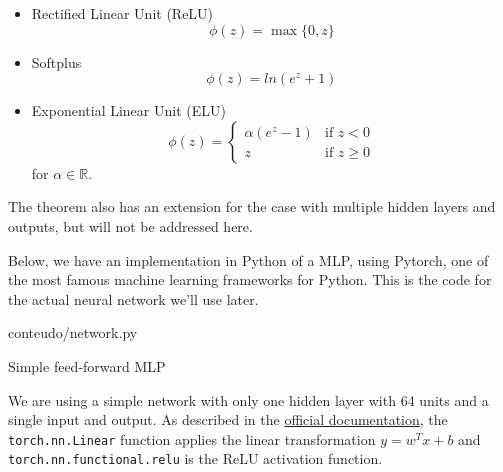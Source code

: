 \begin{itemize}
    \item Rectified Linear Unit (ReLU)
    \[
        \phi(z) = \max\{0, z\}    
    \]
    \item Softplus
    \[
        \phi(z) = ln(e^z+1)
    \]
    \item Exponential Linear Unit (ELU)
    \begin{equation*}
        \phi(z)=
            \begin{cases}
                \alpha(e^z-1) & \text{if } z < 0 \\
                z & \text{if } z \geq 0
            \end{cases}
    \end{equation*}
    for $\alpha \in \mathbb{R}$.
\end{itemize}
The theorem also has an extension for the case with multiple hidden layers and outputs, but will not be addressed here.

Below, we have an implementation in Python of a MLP, using Pytorch, one of the most famous machine learning frameworks for Python. This is the code for the actual neural network we'll use later.
\begin{program}
    
    {conteudo/network.py}
  
    \caption{Simple feed-forward MLP}
  \end{program}
We are using a simple network with only one hidden layer with 64 units and a single input and output. As described in the \href{https://pytorch.org/docs/stable/generated/torch.nn.Linear.html}{official documentation}, the \verb|torch.nn.Linear| function applies the linear transformation $y = w^Tx+b$ and \verb|torch.nn.functional.relu| is the ReLU activation function.
